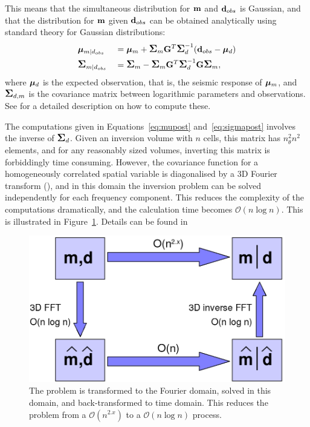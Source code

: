 This means that the simultaneous distribution for $\mathbf{m}$ and
$\mathbf{d}_{obs}$ is Gaussian, and that the distribution for $\mathbf{m}$
given $\mathbf{d}_{obs}$ can be obtained analytically using standard
theory for Gaussian distributions:
%
\begin{alignat}{2}
  &\bm\mu_{m|d_{obs}}    &&=\bm\mu_{m} +\mbox{\large\ensuremath{\boldsymbol{\Sigma}}}_{m}\mathbf{G}^T \mbox{\large\ensuremath{\boldsymbol{\Sigma}}}_{d}^{-1}
                           (\mathbf{d}_{obs}-\bm\mu_{d})     \label{eq:mupost} \\
  &\mbox{\large\ensuremath{\boldsymbol{\Sigma}}}_{m|d_{obs}} &&=\mbox{\large\ensuremath{\boldsymbol{\Sigma}}}_{m} - \mbox{\large\ensuremath{\boldsymbol{\Sigma}}}_{m}\mathbf{G}^T
                           \mbox{\large\ensuremath{\boldsymbol{\Sigma}}}_{d}^{-1}\mathbf{G}\mbox{\large\ensuremath{\boldsymbol{\Sigma}}}_{m},\label{eq:sigmapost}
\end{alignat}
%
where $\bm\mu_{d}$ is the expected observation, that is, the
seismic response of $\bm\mu_m$, and $\mbox{\large\ensuremath{\boldsymbol{\Sigma}}}_{d,m}$ is the
covariance matrix between logarithmic parameters and
observations. See \cite{geo68ab1} for a detailed description on
how to compute these.

The computations given in Equations~\eqref{eq:mupost}
and~\eqref{eq:sigmapost} involves the inverse of $\mbox{\large\ensuremath{\boldsymbol{\Sigma}}}_{d}$. Given an
inversion volume with $n$ cells, this matrix has $n_\theta^2n^2$
elements, and for any reasonably sized volumes, inverting this matrix
is forbiddingly time consuming. However, the covariance function for a
homogeneously correlated spatial variable is diagonalised by a 3D
Fourier transform (\cite{christakos92}), and in this domain the inversion
problem can be solved independently for each frequency component. This
reduces the complexity of the computations dramatically, and the
calculation time becomes $\mathcal{O}(n\log n)$. This is illustrated
in Figure~\ref{fig:FFT-flowdiagram}. Details can be found in
\cite{geo68ab2}
\begin{figure}[H]
  \centering
  \includegraphics[width=.79\linewidth]{images/FFT_flowdiagram}
  \caption{The problem is transformed to the Fourier domain, solved
  in this domain, and back-transformed to time domain. This reduces
  the problem from a $\mathcal{O}(n^{2.x})$ to a $\mathcal{O}(n\log
  n)$ process.}
  \label{fig:FFT-flowdiagram}
\end{figure}


